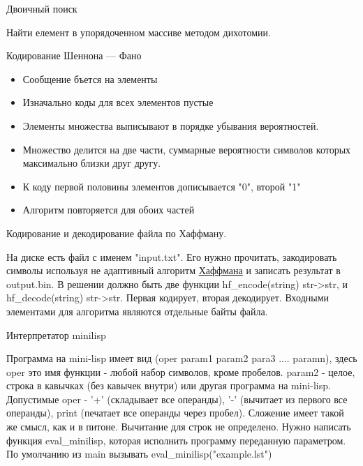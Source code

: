 \documentclass{article}
\begin{document}
\begin{center} Двоичный поиск \end{center}
Найти елемент в упорядоченном массиве методом дихотомии.
\newpage

\begin{center} Кодирование Шеннона — Фано \end{center}
\begin{itemize}
    \item Сообщение бъется на элементы
    \item Изначально коды для всех элементов пустые
    \item Элементы множества выписывают в порядке убывания вероятностей.
    \item Множество делится на две части, суммарные вероятности символов которых
            максимально близки друг другу.
    \item К коду первой половины элементов дописывается "0", второй "1"
    \item Алгоритм повторяется для обоих частей
\end{itemize}
\newpage

\begin{center}Кодирование и декодирование файла по Хаффману.\end{center}
На диске есть файл с именем "input.txt". Его нужно прочитать, закодировать символы 
используя не адаптивный алгоритм 
\href{http://ru.wikipedia.org/wiki/%D0%9A%D0%BE%D0%B4_%D0%A5%D0%B0%D1%84%D1%84%D0%BC%D0%B0%D0%BD%D0%B0}{Хаффмана}  и записать результат в 
output.bin. В решении должно быть две функции 
hf\_encode(string) str->str, и hf\_decode(string) str->str. 
Первая кодирует, вторая декодирует. 
Входными элементами для алгоритма являются отдельные байты файла.
\newpage

\begin{center} Интерпретатор minilisp \end{center}
Программа на mini-lisp имеет вид (oper param1 param2 para3 .... paramn),
здесь oper это имя функции - любой набор символов, кроме пробелов.
param2 - целое, строка в кавычках (без кавычек внутри) или другая программа на mini-lisp.
Допустимые oper - '+' (складывает все операнды), '-' (вычитает из первого все операнды), 
print (печатает все операнды через пробел). Сложение имеет такой же смысл, как и в питоне. 
Вычитание для строк не определено. Нужно написать функция eval\_minilisp, которая 
исполнить программу переданную параметром. 
По умолчанию из main вызывать eval\_minilisp("example.lst")
\end{document}
